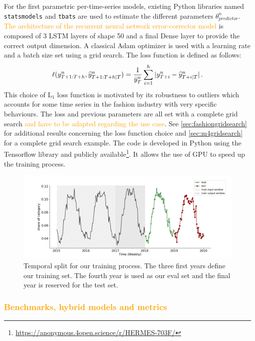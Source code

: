 \documentclass[10pt]{article} %
\newcommand{\ts}{y}
\newcommand{\tspred}{\widehat{\ts}}
\newcommand{\statparam}{\theta_{predictor}}
\newcommand{\lag}{h}
\newcommand{\meants}{\Bar{\ts}}
\begin{document}
For the first parametric per-time-series models, existing Python  libraries named \texttt{statsmodels} and  \texttt{tbats} are used to estimate the different parameters $\statparam^n$. \textcolor{orange}{The architecture of the recurrent neural network error-corrector model} is composed of 3 LSTM layers of shape 50 and a final Dense layer to provide the correct output dimension. A classical Adam optimizer is used with a learning rate and a batch size set using a grid search. The loss function is defined as follows:
$$
\ell(\ts^n_{T+1:T+\lag},\tspred^n_{T+1:T+\lag|T}) = \frac{1}{\meants^n_T}\sum_{i=1}^{\lag}|\ts^n_{T+i} - \tspred^n_{T+i|T}|\,.
$$
This choice of $\mathrm{L}_1$ loss function is motivated by its robustness to outliers which accounts for some time series in the fashion industry with very specific behaviours. The loss and previous parameters are all set with a complete grid search \textcolor{orange}{and have to be adapted regarding the use case}. See \ref{sec:fashiongridsearch} for additional results concerning the loss function choice and \ref{sec:m4gridsearch} for a complete grid search example. The code is developed in Python using the Tensorflow library and publicly available\footnote[1]{\url{https://anonymous.4open.science/r/HERMES-703F/}}. It allows the use of GPU to speed up the training process.



\begin{figure}
  \centering
    \includegraphics[width=1.\linewidth]{train_eval_test_set}
  \caption{Temporal split for our training process. The three first years define our training set. The fourth year is used as our eval set and the final year is reserved for the test set.}
\label{fig:train_eval_test_set}
\end{figure}

\textcolor{orange}{\subsubsection{Benchmarks, hybrid models and metrics}}
\label{sec:fashiontraining}
\end{document}
